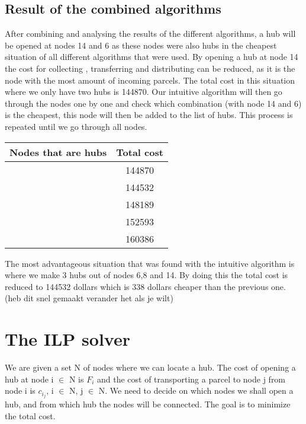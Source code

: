 \documentclass{article}
\begin{document}
\newpage
    
    
    \subsection{Result of the combined algorithms}
After combining and analysing the results of the different algorithms, a hub will be opened at nodes 14 and 6 as these nodes were also hubs in the cheapest situation of all different algorithms that were used. By opening a hub at node 14 the cost for collecting , transferring and distributing can be reduced, as it is the node with the most amount of incoming parcels. The total cost in this situation where we only have two hubs is 144870. Our intuitive algorithm will then go through the nodes one by one and check which combination (with node 14 and 6) is the cheapest, this node will then be added to the list of hubs. This process is repeated until we go through all nodes. 

\begin{table}[h]
\begin{tabular}{||c |c||}
\hline
Nodes that are hubs & Total cost\\
\hline
[6,14] &  144870 \\
\hline
[6,8,14]   & 144532\\
\hline
[2,6,8,14] & 148189 \\
\hline
[2,5,6,8,14]  & 152593  \\
\hline
[2,5,6,8,12,14] & 160386 \\
\end{tabular}
\end{table}

The most advantageous situation that was found with the intuitive algorithm is 
where we make 3 hubs out of nodes 6,8 and 14. By doing this the total cost is reduced to 144532 dollars which is 338 dollars cheaper than the previous one.    (heb dit snel gemaakt verander het als je wilt)



 
\newpage  
\section{The ILP solver}
We are given a set N of nodes where we can locate a hub. The cost of opening a hub at node i $\in$ N is $F_i$ and the cost of transporting a parcel to node j from node i is $c_{i_j}$, i $\in$ N, j $\in$ N. We need to decide on which nodes we shall open a hub, and from which hub the nodes will be connected. The goal is to minimize the total cost. 
\end{document}
